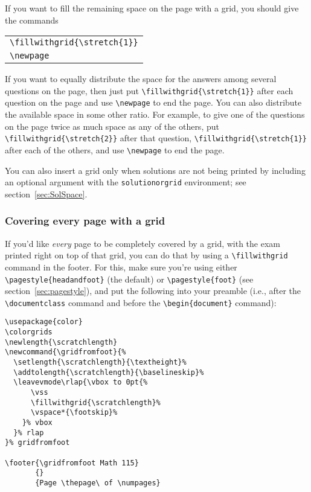 \documentclass[12pt]{exam}
\makeatletter
\newcommand{\indc}[1]{\index{#1@\texttt{\char`\\#1}}}
\makeatother
\begin{document}
If you want to fill the remaining space on the page with a grid, you
should give the commands\indc{stretch}
\begin{center}
  \begin{tabular}{l}
    \verb"\fillwithgrid{\stretch{1}}"\\
    \verb"\newpage"
  \end{tabular}
\end{center}
If you want to equally distribute the space for the answers among
several questions on the page, then just put
\verb"\fillwithgrid{\stretch{1}}" after each
question on the page and use \verb"\newpage" to end the page.  You can
also distribute the available space in some other ratio.  For example,
to give one of the questions on the page twice as much space as any of
the others, put \verb"\fillwithgrid{\stretch{2}}" after that question,
\verb"\fillwithgrid{\stretch{1}}" after each of the others, and use
\verb"\newpage" to end the page.

You can also insert a grid only when solutions are not being
printed by including an optional argument with the
\verb"solutionorgrid" environment; see
section~\ref{sec:SolSpace}.

\subsubsection{Covering every page with a grid}
\label{sec:CoverWGrid}

If you'd like \emph{every} page to be completely covered by a grid,
with the exam printed right on top of that grid, you can do that by
using a \verb"\fillwithgrid" command in the footer.  For this, make
sure you're using either \verb"\pagestyle{headandfoot}" (the default)
or \verb"\pagestyle{foot}" (see section~\ref{sec:pagestyle}), and put
the following into your preamble (i.e., after the
\verb"\documentclass" command and before the \verb"\begin{document}"
  command):
\begin{verbatim}
\usepackage{color}
\colorgrids
\newlength{\scratchlength}
\newcommand{\gridfromfoot}{%
  \setlength{\scratchlength}{\textheight}%
  \addtolength{\scratchlength}{\baselineskip}%
  \leavevmode\rlap{\vbox to 0pt{%
      \vss
      \fillwithgrid{\scratchlength}%
      \vspace*{\footskip}%
    }% vbox
  }% rlap
}% gridfromfoot

\footer{\gridfromfoot Math 115}
       {}
       {Page \thepage\ of \numpages}
\end{verbatim}
\end{document}
